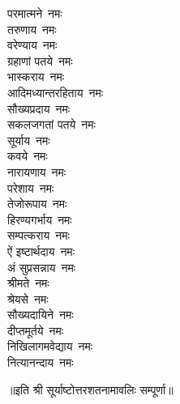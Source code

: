 \begin{multicols}{2}
\begin{flushleft}
परमात्मने~नमः\\
तरुणाय~नमः\\
वरेण्याय~नमः\\
ग्रहाणां पतये~नमः\\
भास्कराय~नमः\hfill{}\\
आदिमध्यान्तरहिताय~नमः\\
सौख्यप्रदाय~नमः\\
सकलजगतां पतये~नमः\\
सूर्याय~नमः\\
कवये~नमः\\
नारायणाय~नमः\\
परेशाय~नमः\\
तेजोरूपाय~नमः\\
हिरण्यगर्भाय~नमः\\
सम्पत्कराय~नमः\hfill{}\\
ऐं इष्टार्थदाय~नमः\\
अं सुप्रसन्नाय~नमः\\
श्रीमते~नमः\\
श्रेयसे~नमः\\
सौख्यदायिने~नमः\\
दीप्तमूर्तये~नमः\\
निखिलागमवेद्याय~नमः\\
नित्यानन्दाय~नमः\hfill{}\\
    \end{flushleft}
\end{multicols}
॥इति श्री सूर्याष्टोत्तरशतनामावलिः सम्पूर्णा॥
